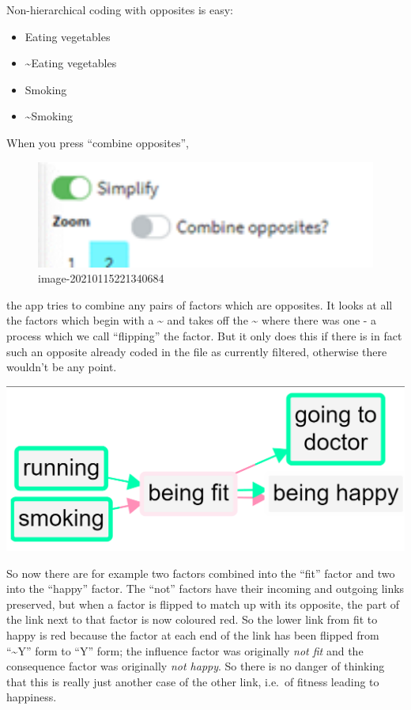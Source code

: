 \documentclass[
]{book}
\providecommand{\tightlist}{%
  \setlength{\itemsep}{0pt}\setlength{\parskip}{0pt}}
\begin{document}
Non-hierarchical coding with opposites is easy:

\begin{itemize}
\tightlist
\item
  Eating vegetables
\item
  \textasciitilde Eating vegetables
\item
  Smoking
\item
  \textasciitilde Smoking
\end{itemize}

When you press ``combine opposites'',

\begin{figure}
\centering
\includegraphics[width=6.77083in,height=\textheight]{_assets/image-20210115221340684.png}
\caption{image-20210115221340684}
\end{figure}

the app tries to combine any pairs of factors which are opposites. It looks at all the factors which begin with a \textasciitilde{} and takes off the \textasciitilde{} where there was one - a process which we call ``flipping'' the factor. But it only does this if there is in fact such an opposite already coded in the file as currently filtered, otherwise there wouldn't be any point.

\includegraphics{_assets/121008.png}

So now there are for example two factors combined into the ``fit'' factor and two into the ``happy'' factor. The ``not'' factors have their incoming and outgoing links preserved, but when a factor is flipped to match up with its opposite, the part of the link next to that factor is now coloured red. So the lower link from fit to happy is red because the factor at each end of the link has been flipped from ``\textasciitilde Y'' form to ``Y'' form; the influence factor was originally \emph{not fit} and the consequence factor was originally \emph{not happy}. So there is no danger of thinking that this is really just another case of the other link, i.e.~of fitness leading to happiness.
\end{document}
